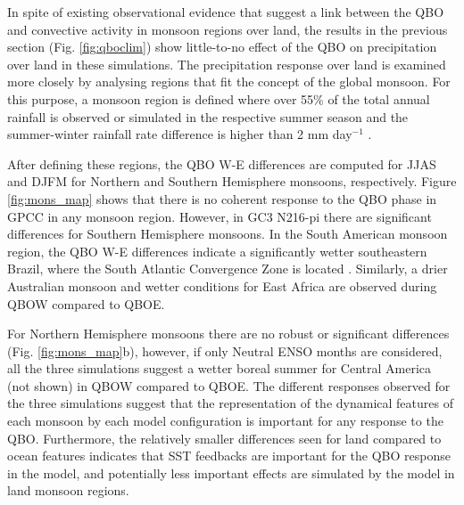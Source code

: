 In spite of existing observational evidence \citep{collimore2003,liess2012,gray2018} that suggest a link between the QBO and convective activity in monsoon regions over land, the results in the previous section (Fig. \ref{fig:qboclim}) show little-to-no effect of the QBO on precipitation over land in these simulations. 
The precipitation response over land is examined more closely by analysing regions that fit the concept of the global monsoon. For this purpose, a monsoon region is defined where over 55\% of the total annual rainfall is observed or simulated in the respective summer season and the summer-winter rainfall rate difference is higher than  2 mm day$^{-1}$ \citep{wang2008,wang2017,wang2021monsoons}. 

After defining these regions, the QBO W-E differences are computed for JJAS and DJFM for Northern and Southern Hemisphere monsoons, respectively. 
Figure \ref{fig:mons_map} shows that there is no coherent response to the QBO phase in  GPCC in any monsoon region. However, in GC3 N216-pi there are significant differences for Southern Hemisphere monsoons. In the South American monsoon region, the QBO W-E differences indicate a significantly wetter southeastern Brazil, where the South Atlantic Convergence Zone is located \citep{zilli2019}. Similarly, a drier Australian monsoon and wetter conditions for East Africa are observed during QBOW compared to QBOE.

For Northern Hemisphere monsoons there are no robust or significant differences (Fig. \ref{fig:mons_map}b), however, if only Neutral ENSO months are considered, all the three simulations suggest a wetter boreal summer for Central America (not shown) in QBOW compared to QBOE. 
The different responses observed for the three simulations suggest that the representation of the dynamical features of each monsoon by each model configuration is important for any response to the QBO. Furthermore, the relatively smaller differences seen for land compared to ocean features indicates that SST feedbacks are important for the QBO response in the model, and potentially less important effects are simulated by the model in land monsoon regions.



